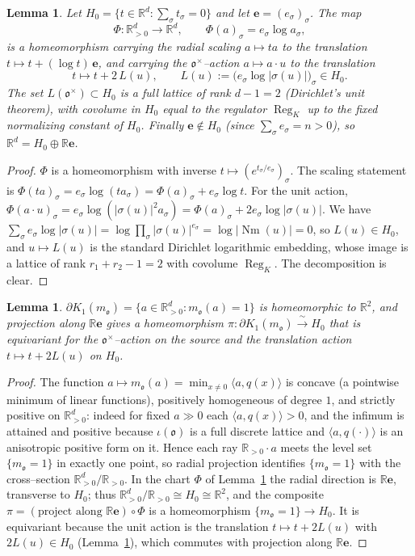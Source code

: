 \documentclass[11pt,reqno]{amsart}
\theoremstyle{plain}
\newtheorem{lemma}[theorem]{Lemma}
\theoremstyle{definition}
\newcommand{\R}{\mathbb{R}}
\newcommand{\Nm}{\operatorname{Nm}}
\newcommand{\Reg}{\operatorname{Reg}}
\newcommand{\Ok}{\mathfrak{o}}
\newcommand{\bdy}{\partial}
\begin{document}
\begin{lemma}\label{lem:chart}
Let $H_0=\{t\in\R^d:\sum_\sigma t_\sigma=0\}$ and let $\mathbf e=(e_\sigma)_\sigma$. The map
\[
\Phi:\R^d_{>0}\to\R^d,\qquad \Phi(a)_\sigma=e_\sigma\log a_\sigma ,
\]
is a homeomorphism carrying the radial scaling $a\mapsto ta$ to the translation
$t\mapsto t+(\log t)\,\mathbf e$, and carrying the $\Ok^\times$--action $a\mapsto a\cdot u$ to the translation
\[
t\mapsto t+2\,L(u),\qquad L(u):=\big(e_\sigma\log|\sigma(u)|\big)_\sigma\in H_0 .
\]
The set $L(\Ok^\times)\subset H_0$ is a full lattice of rank $d-1=2$ (Dirichlet's unit theorem), with
covolume in $H_0$ equal to the regulator $\Reg_K$ up to the fixed normalizing constant of $H_0$. Finally
$\mathbf e\notin H_0$ (since $\sum_\sigma e_\sigma=n>0$), so $\R^d=H_0\oplus\R\mathbf e$.
\end{lemma}

\begin{proof}
$\Phi$ is a homeomorphism with inverse $t\mapsto(e^{t_\sigma/e_\sigma})_\sigma$. The scaling statement is
$\Phi(ta)_\sigma=e_\sigma\log(ta_\sigma)=\Phi(a)_\sigma+e_\sigma\log t$. For the unit action,
$\Phi(a\cdot u)_\sigma=e_\sigma\log(|\sigma(u)|^2a_\sigma)=\Phi(a)_\sigma+2e_\sigma\log|\sigma(u)|$. We have
$\sum_\sigma e_\sigma\log|\sigma(u)|=\log\prod_\sigma|\sigma(u)|^{e_\sigma}=\log|\Nm(u)|=0$, so $L(u)\in H_0$,
and $u\mapsto L(u)$ is the standard Dirichlet logarithmic embedding, whose image is a lattice of rank
$r_1+r_2-1=2$ with covolume $\Reg_K$. The decomposition is clear.
\end{proof}

\begin{lemma}\label{lem:plane}
$\bdy K_1(m_\Ok)=\{a\in\R^d_{>0}:m_\Ok(a)=1\}$ is homeomorphic to $\R^2$, and projection along
$\R\mathbf e$ gives a homeomorphism $\pi:\bdy K_1(m_\Ok)\xrightarrow{\ \sim\ }H_0$ that is equivariant for
the $\Ok^\times$--action on the source and the translation action $t\mapsto t+2L(u)$ on $H_0$.
\end{lemma}

\begin{proof}
The function $a\mapsto m_\Ok(a)=\min_{x\ne0}\langle a,q(x)\rangle$ is concave (a pointwise minimum of linear
functions), positively homogeneous of degree $1$, and strictly positive on $\R^d_{>0}$: indeed for fixed
$a\gg0$ each $\langle a,q(x)\rangle>0$, and the infimum is attained and positive because $\iota(\Ok)$ is a
full discrete lattice and $\langle a,q(\cdot)\rangle$ is an anisotropic positive form on it. Hence each ray
$\R_{>0}\cdot a$ meets the level set $\{m_\Ok=1\}$ in exactly one point, so radial projection identifies
$\{m_\Ok=1\}$ with the cross--section $\R^d_{>0}/\R_{>0}$. In the chart $\Phi$ of Lemma~\ref{lem:chart} the
radial direction is $\R\mathbf e$, transverse to $H_0$; thus $\R^d_{>0}/\R_{>0}\cong H_0\cong\R^2$, and the
composite $\pi=(\text{project along }\R\mathbf e)\circ\Phi$ is a homeomorphism $\{m_\Ok=1\}\to H_0$. It is
equivariant because the unit action is the translation $t\mapsto t+2L(u)$ with $2L(u)\in H_0$
(Lemma~\ref{lem:chart}), which commutes with projection along $\R\mathbf e$.
\end{proof}
\end{document}
